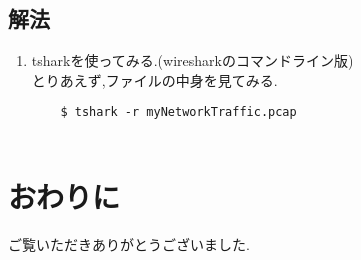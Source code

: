 \documentclass[dvipdfmx]{jsarticle}
\begin{document}
\subsection{解法}
\begin{enumerate}
	\item tsharkを使ってみる.(wiresharkのコマンドライン版)\\
	とりあえず,ファイルの中身を見てみる.
	\begin{verbatim}	
	$ tshark -r myNetworkTraffic.pcap
	
	\end{verbatim}
\end{enumerate}
\section{おわりに}
ご覧いただきありがとうございました.
\end{document}
